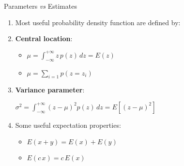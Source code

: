 \documentclass{beamer}
\begin{document}
\begin{frame}{Parameters \textit{vs} Estimates}

  \begin{enumerate}
  
  \item<1-> Most useful  probability density function are defined by:  

  \vspace{0.2cm}  
  
  
  \item<2-> \textbf{Central location}: 
    
    \begin{itemize}
     
      \item  $\mu =  \int_{-\infty}^{+\infty} z \,p(z)\, dz = E(z)$
      \vspace{0.2cm}  
            
      \item  $\mu = \sum\limits_{i=1} p(z=z_{i})$ 
   
    \end{itemize}   
   
  
  \vspace{0.2cm}   
 
  
  \item<3-> \textbf{Variance parameter}: 
  \vspace{0.2cm}   
  
  $\sigma^2 = \int_{-\infty}^{+\infty} (z - \mu)^{2} p(z)\, dz = E\left[(z - \mu)^2 \right]$
    
  \vspace{0.2cm}   
 
 
  \item<4-> Some useful expectation properties:
  \vspace{0.2cm} 

  \begin{itemize}
  
   \item $E(x+y) = E(x) + E(y)$ 
   \vspace{0.2cm} 
   
   \item $E(c\,x) = c \, E(x)$
  
  \end{itemize}      
  
  \vspace{0.2cm}
    
  \end{enumerate}    
  
\end{frame}
\end{document}
